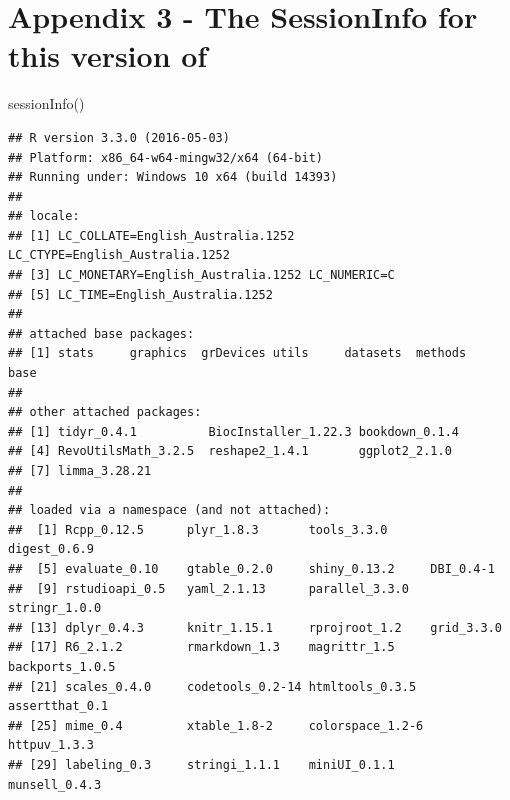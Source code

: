 \documentclass[a4paper]{book}
\newenvironment{Shaded}{}{}
\newcommand{\KeywordTok}[1]{\textcolor[rgb]{0.00,0.00,1.00}{{#1}}}
\newcommand{\NormalTok}[1]{{#1}}
\newlength{\leftbarwidth}
\newlength{\leftbarsep}
\newcommand*{\leftbarcolorcmd}{\color{darkgray}}%
\renewenvironment{leftbar}{%
    \def\FrameCommand{{\leftbarcolorcmd{\vrule width \leftbarwidth\relax\hspace {\leftbarsep}}}}%
    \MakeFramed {\advance \hsize -\width \FrameRestore }%
}{%
    \endMakeFramed
}
\renewenvironment{Shaded}
{\vspace{0em}\begin{leftbar}\begin{snugshade}}
{\end{snugshade}\end{leftbar}\vspace{0pt}}
\begin{document}
\chapter*{Appendix 3 - The SessionInfo for this version
of}\label{appendix-3---the-sessioninfo-for-this-version-of}

\begin{Shaded}
\begin{Highlighting}[]
\KeywordTok{sessionInfo}\NormalTok{()}
\end{Highlighting}
\end{Shaded}

\begin{verbatim}
## R version 3.3.0 (2016-05-03)
## Platform: x86_64-w64-mingw32/x64 (64-bit)
## Running under: Windows 10 x64 (build 14393)
## 
## locale:
## [1] LC_COLLATE=English_Australia.1252  LC_CTYPE=English_Australia.1252   
## [3] LC_MONETARY=English_Australia.1252 LC_NUMERIC=C                      
## [5] LC_TIME=English_Australia.1252    
## 
## attached base packages:
## [1] stats     graphics  grDevices utils     datasets  methods   base     
## 
## other attached packages:
## [1] tidyr_0.4.1          BiocInstaller_1.22.3 bookdown_0.1.4      
## [4] RevoUtilsMath_3.2.5  reshape2_1.4.1       ggplot2_2.1.0       
## [7] limma_3.28.21       
## 
## loaded via a namespace (and not attached):
##  [1] Rcpp_0.12.5      plyr_1.8.3       tools_3.3.0      digest_0.6.9    
##  [5] evaluate_0.10    gtable_0.2.0     shiny_0.13.2     DBI_0.4-1       
##  [9] rstudioapi_0.5   yaml_2.1.13      parallel_3.3.0   stringr_1.0.0   
## [13] dplyr_0.4.3      knitr_1.15.1     rprojroot_1.2    grid_3.3.0      
## [17] R6_2.1.2         rmarkdown_1.3    magrittr_1.5     backports_1.0.5 
## [21] scales_0.4.0     codetools_0.2-14 htmltools_0.3.5  assertthat_0.1  
## [25] mime_0.4         xtable_1.8-2     colorspace_1.2-6 httpuv_1.3.3    
## [29] labeling_0.3     stringi_1.1.1    miniUI_0.1.1     munsell_0.4.3
\end{verbatim}
\end{document}
